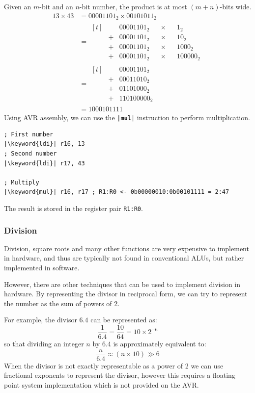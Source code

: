 \documentclass{article}
\newcommand{\keyword}[1]{\textcolor[rgb]{0.00,0.50,0.00}{\textbf{#1}}}
\begin{document}
Given an \(m\)-bit and an \(n\)-bit number, the product is at most \((m+n)\)-bits wide.
\begin{align*}
    13 \times 43 & = 00001101_2 \times 00101011_2          \\
                 & = \begin{aligned}[t]
                          &   & 00001101_2 & & \times & & 1_2      \\
                          & + & 00001101_2 & & \times & & 10_2     \\
                          & + & 00001101_2 & & \times & & 1000_2   \\
                          & + & 00001101_2 & & \times & & 100000_2
                     \end{aligned} \\
                 & = \begin{aligned}[t]
                          &   & 00001101_2  \\
                          & + & 00011010_2  \\
                          & + & 01101000_2  \\
                          & + & 110100000_2
                     \end{aligned}                    \\
                 & = 1000101111
\end{align*}
Using AVR assembly, we can use the \texttt{|\keyword{mul}|} instruction to perform multiplication.
\begin{verbatim}
; First number
|\keyword{ldi}| r16, 13
; Second number
|\keyword{ldi}| r17, 43

; Multiply
|\keyword{mul}| r16, r17 ; R1:R0 <- 0b00000010:0b00101111 = 2:47
\end{verbatim}
The result is stored in the register pair \texttt{R1:R0}.
\subsubsection{Division}
Division, square roots and many other functions are very expensive to implement in hardware,
and thus are typically not found in conventional ALUs, but rather
implemented in software.

However, there are other techniques that can be used to implement division in hardware.
By representing the divisor in reciprocal form, we can try to represent the number as
the sum of powers of 2.

For example, the divisor \(6.4\) can be represented as:
\begin{equation*}
    \frac{1}{6.4} = \frac{10}{64} = 10 \times 2^{-6}
\end{equation*}
so that dividing an integer \(n\) by \(6.4\) is approximately equivalent to:
\begin{equation*}
    \frac{n}{6.4} \approx \left( n \times 10 \right) \gg 6
\end{equation*}
When the divisor is not exactly representable as a power of 2 we can use fractional exponents to represent the divisor, however this requires a floating point system implementation which is not provided on the AVR.
\end{document}
